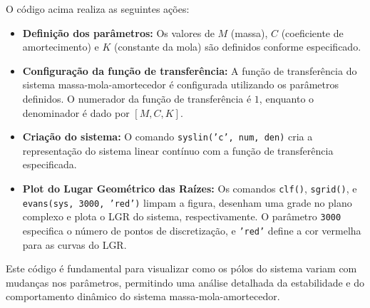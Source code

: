 O código acima realiza as seguintes ações:
\begin{itemize}
    \item \textbf{Definição dos parâmetros:} Os valores de \( M \) (massa), \( C \) (coeficiente de amortecimento) e \( K \) (constante da mola) são definidos conforme especificado.
    \item \textbf{Configuração da função de transferência:} A função de transferência do sistema massa-mola-amortecedor é configurada utilizando os parâmetros definidos. O numerador da função de transferência é \(1\), enquanto o denominador é dado por \( [M, C, K] \).
    \item \textbf{Criação do sistema:} O comando \texttt{syslin('c', num, den)} cria a representação do sistema linear contínuo com a função de transferência especificada.
    \item \textbf{Plot do Lugar Geométrico das Raízes:} Os comandos \texttt{clf()}, \texttt{sgrid()}, e \texttt{evans(sys, 3000, 'red')} limpam a figura, desenham uma grade no plano complexo e plota o LGR do sistema, respectivamente. O parâmetro \texttt{3000} especifica o número de pontos de discretização, e \texttt{'red'} define a cor vermelha para as curvas do LGR.
\end{itemize}

Este código é fundamental para visualizar como os pólos do sistema variam com mudanças nos parâmetros, permitindo uma análise detalhada da estabilidade e do comportamento dinâmico do sistema massa-mola-amortecedor.

